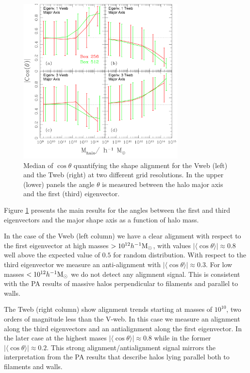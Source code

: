 \documentclass[useAMS,usenatbib]{mn2e}
\newcommand{\hMsun}{{\ifmmode{h^{-1}{\rm
        {M_{\odot}}}}\else{$h^{-1}{\rm{M_{\odot}}}$}\fi}}
\newcommand{\muavg}{\vert\langle\cos\theta\rangle\vert}
\begin{document}
\begin{figure}
\includegraphics[width=0.75\textwidth]{Fig2.pdf}
\caption{Median of $\cos\theta$ quantifying the shape alignment for
  the Vweb (left) and the Tweb (right) at two different grid
  resolutions. In the upper (lower) panels the angle $\theta$ is
  measured between the halo major axis and the first (third)
  eigenvector.\label{fig:shape_alignment}} 
\end{figure}

Figure \ref{fig:shape_alignment} presents the main results for the
angles between the first and third eigenvectors and the major shape
axis as a function of halo mass. 

In the case of the Vweb (left column) we have a clear alignment with
respect to the first eigenvector at high masses $>10^{12}\hMsun$, with
values $\muavg\approx 0.8$ well above the expected value of $0.5$ for
random distribution. With respect to the third eigenvector we measure
an anti-alignment with $\muavg\approx0.3$. For low masses
$<10^{12}\hMsun$ we do not detect any aligmnent signal. This is 
consistent with the PA results of massive halos
perpendicular to filaments and parallel to walls.

The Tweb (right column) show alignment trends starting at masses of
$10^{10}$\hMsun, two orders of magnitude less than the V-web. In this
case we measure an alignment along the third eigenvectors and an
antialignment along the first eigenvector. In the later case at the
highest mases $\muavg\approx 0.8$ while in the former $\muavg\approx
0.2$. This strong alignment/antialignment signal mirrors the
interpretation from the PA results that describe halos lying parallel
both to filaments and walls.
\end{document}
